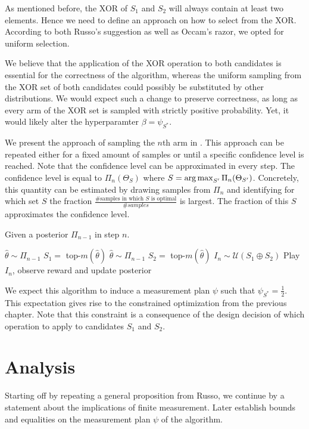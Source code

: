 As mentioned before, the XOR of $S_1$ and $S_2$ will always contain at least two
elements. Hence we need to define an approach on how to select from the XOR.
According to both Russo's suggestion as well as Occam's razor, we opted for
uniform selection.

We believe that the application of the XOR operation to both candidates is
essential for the correctness of the algorithm, whereas the uniform sampling
from the XOR set of both candidates could possibly be substituted by other
distributions. We would expect such a change to preserve correctness, as long as
every arm of the XOR set is sampled with strictly positive probability. Yet, it
would likely alter the hyperparamter $\beta = \psi_{S^*}$.

We present the approach of sampling the $n$th arm in .
This approach can be repeated either for a fixed amount of samples or until a
specific confidence level is reached. Note that the confidence level can be
approximated in every step. The confidence level is equal to $\Pi_n(\Theta_S)$
where $S = \operatorname*{arg\,max}_{S'} \Pi_n(\Theta_{S'})$. Concretely, this quantity can be
estimated by drawing samples from $\Pi_n$ and identifying for which set $S$ the
fraction $\frac{\text{\# samples in which $S$ is optimal}}{\#samples}$ is
largest. The fraction of this $S$ approximates the confidence level.
\begin{algorithm}[H]
  \caption{Given a posterior $\Pi_{n-1}$ in step $n$.}
  \label{alg:TXTS}
  \begin{algorithmic}
    \State $\hat{\theta} \sim \Pi_{n-1}$
    \State $S_1 =$ top-$m(\hat{\theta})$
    \Repeat
      \State $\hat{\theta} \sim \Pi_{n-1}$
      \State $S_2 = $ top-$m(\hat{\theta})$
    \State $I_n \sim \mathcal{U}(S_1 \oplus S_2)$
    \State Play $I_n$, observe reward and update posterior
  \end{algorithmic}
\end{algorithm}
We expect this algorithm to induce a measurement plan $\psi$ such that
$\psi_{S^*} = \frac{1}{2}$. This expectation gives rise to the constrained
optimization from the previous chapter. Note that this constraint is a
consequence of the design decision of which operation to apply to candidates
$S_1$ and $S_2$.

\section{Analysis}\label{section:analysis}
Starting off by repeating a general proposition from Russo, we continue by a statement about the implications of finite measurement. Later establish bounds and equalities on the measurement plan $\psi$ of the
algorithm.

